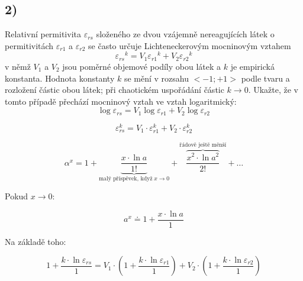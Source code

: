 \newpage


\subsection*{2)}
Relativní permitivita $\varepsilon_{rs}$ složeného ze dvou vzájemně nereagujících látek o permitivitách $\varepsilon_{r1}$ a $\varepsilon_{r2}$ se často určuje Lichteneckerovým mocninovým vztahem
\begin{equation}
    {{\varepsilon_{rs}}^k}={V_1{\varepsilon_{r1}}^k}+{V_2{\varepsilon_{r2}}^k}
\end{equation}
v němž $V_1$ a $V_2$ jsou poměrné objemové podíly obou látek a $k$ je empirická konstanta. Hodnota konstanty $k$ se mění v rozsahu $<-1; +1>$ podle tvaru a rozložení částic obou látek; při chaotickém uspořádání částic $k\rightarrow 0$. Ukažte, že v tomto případě přechází mocninový vztah ve vztah logaritmický:
\begin{equation}
    {\log{\varepsilon_{rs}}}={V_1\log{\varepsilon_{r1}}}+{V_2\log{\varepsilon_{r2}}}
\end{equation}


\begin{equation*}
    \varepsilon_{rs}^k = V_1 \cdot \varepsilon_{r1}^k + V_2 \cdot \varepsilon_{r2}^k
\end{equation*}

\begin{equation*}
    \alpha^x = 1 + \underbrace{\frac{x \cdot \ln a}{1!}}_{\textrm{malý příspěvek, když} \; x \rightarrow 0} + \overbrace{\frac{x^2 \cdot \ln a^2}{2!}}^{\textrm{řádově ještě měnší}} + \dots 
\end{equation*}

Pokud $x\rightarrow 0$:

\begin{equation*}
    a^x \doteq 1 + \frac{x \cdot \ln a}{1}
\end{equation*}

Na základě toho:

\begin{equation*}
    1 + \frac{k \cdot \ln \varepsilon_{rs}}{1} = V_1 \cdot \left( 1 + \frac{k \cdot \ln \varepsilon_{r1}}{1} \right) + V_2 \cdot \left( 1 + \frac{k \cdot \ln \varepsilon_{r2}}{1} \right)
\end{equation*}
 
